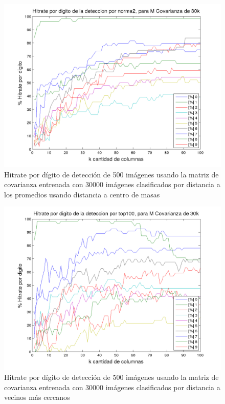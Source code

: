 \begin{figure}[H]
\begin {center}
\includegraphics[width=\pdwidth]{plots/pordig-30kcv-norma2.png}
\end {center}
\caption{Hitrate por d\'igito de detecci\'on de 500 im\'agenes usando la matriz de covarianza entrenada con 30000 im\'agenes
clasificados por distancia a los promedios usando distancia a centro de masas}
\label{fig:HRD30kcv-n2}
\end{figure}

\begin{figure}[H]
\begin {center}
\includegraphics[width=\pdwidth]{plots/pordig-30kcv-top100.png}
\end {center}
\caption{Hitrate por d\'igito de detecci\'on de 500 im\'agenes usando la matriz de covarianza entrenada con 30000 im\'agenes
clasificados por distancia a vecinos m\'as cercanos}
\label{fig:HRD30kcv-dist100}
\end{figure}

